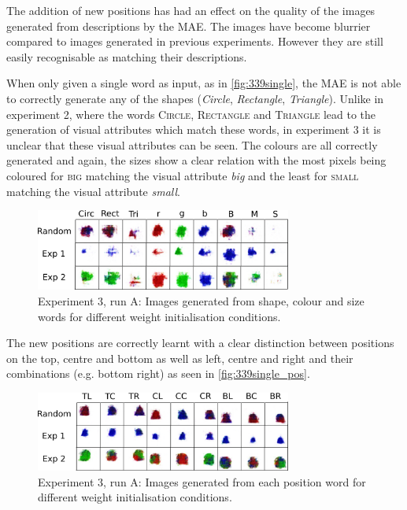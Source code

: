 The addition of new positions has had an effect on the quality of the images generated from descriptions by the \ac{MAE}. The images have become blurrier compared to images generated in previous experiments. However they are still easily recognisable as matching their descriptions.

When only given a single word as input, as in \autoref{fig:339single}, the MAE is not able to correctly generate any of the shapes (\textit{Circle}, \textit{Rectangle}, \textit{Triangle}). Unlike in experiment 2, where the words \textsc{Circle}, \textsc{Rectangle} and \textsc{Triangle} lead to the generation of visual attributes which match these words, in experiment 3 it is unclear that these visual attributes can be seen.
The colours are all correctly generated and again, the sizes show a clear relation with the most pixels being coloured for \textsc{big} matching the visual attribute \textit{big} and the least for \textsc{small} matching the visual attribute \textit{small}.

\begin{figure}[h]
\centering
\includegraphics[width=0.75\textwidth]{Figs/shapes/singlelabel339.png}
\caption{Experiment 3, run A: Images generated from shape, colour and size words for different weight initialisation conditions.}
\label{fig:339single}
\end{figure}

The new positions are correctly learnt with a clear distinction between positions on the top, centre and bottom as well as left, centre and right and their combinations (e.g. bottom right) as seen in \autoref{fig:339single_pos}.

\begin{figure}[h]
\centering
\includegraphics[width=0.75\textwidth]{Figs/shapes/singlelabel339_pos.png}
\caption{Experiment 3, run A: Images generated from each position word for different weight initialisation conditions.}
\label{fig:339single_pos}
\end{figure}


